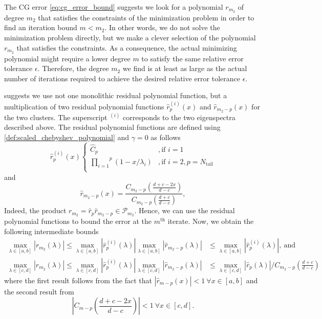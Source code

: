 The CG error \cref{eq:cg_error_bound} suggests we look for a polynomial $r_{m_2}$ of degree $m_2$ that satisfies the constraints of the minimization problem in order to find an iteration bound $m < m_2$. In other words, we do not solve the minimization problem directly, but we make a clever selection of the polynomial $r_{m_2}$ that satisfies the constraints. As a consequence, the actual minimizing polynomial might require a lower degree $m$ to satisfy the same relative error tolerance $\epsilon$. Therefore, the degree $m_2$ we find is at least as large as the actual number of iterations required to achieve the desired relative error tolerance $\epsilon$.

\citeauthor{cg_sharpened_convrate_Axelsson1976} suggests we use not one monolithic residual polynomial function, but a multiplication of two residual polynomial functions $\hat{r}^{(i)}_p(x)$ and $\hat{r}_{m_2-p}(x)$ for the two clusters. The superscript $^{(i)}$ corresponds to the two eigenspectra described above. The residual polynomial functions are defined using \cref{def:scaled_chebyshev_polynomial} and $\gamma = 0$ as follows
\begin{equation}
    \hat{r}^{(i)}_p (x)
    \begin{cases}
        \hat{C}_p&, \text{if } i = 1\\
        \overset{p}{\underset{i=1}{\prod}} (1 - x/\lambda_i)&, \text{if } i = 2, p = N_{\text{tail}}\\
    \end{cases}
    \label{eq:residual_polynomial_rm}
\end{equation}
and
\begin{equation}
    \hat{r}_{{m_2}-p} (x) = \frac{C_{m_2-p} \left(\frac{d + c - 2x}{d - c}\right)}{C_{m_2-p}\left(\frac{d + c}{d - c}\right)},
    \label{eq:residual_polynomial_rpm}
\end{equation}
Indeed, the product $r_{m_2} = \hat{r}_p \hat{r}_{m_2-p} \in \mathcal{P}_{m_2}$. Hence, we can use the residual polynomial functions to bound the error at the $m^{\text{th}}$ iterate. Now, we obtain the following intermediate bounds
\begin{subequations}
    \begin{align}
        \max_{\lambda \in [a,b]} |r_{m_2}(\lambda)| \leq \max_{\lambda \in [a,b]} |\hat{r}^{(i)}_p(\lambda)| \max_{\lambda \in [a,b]} |\hat{r}_{m_2-p}(\lambda)| &\leq \max_{\lambda \in [a,b]} |\hat{r}^{(i)}_p(\lambda)|, \ \text{and} \label{eq:residual_polynomial_bound_ab}\\
        \max_{\lambda \in [c,d]} |r_{m_2}(\lambda)| \leq \max_{\lambda \in [c,d]} |\hat{r}^{(i)}_p(\lambda)| \max_{\lambda \in [c,d]} |\hat{r}_{m_2-p}(\lambda)| &\leq \max_{\lambda \in [c,d]} |\hat{r}_{p}(\lambda)|/C_{m_2-p}\left(\frac{d+c}{d-c}\right) \label{eq:residual_polynomial_bound_cd}
    \end{align}
\end{subequations}
where the first result follows from the fact that $|\hat{r}_{m-p}(x)| < 1 \ \forall x \in [a,b]$ and the second result from 
\[
    \left|C_{m-p}\left(\frac{d+c -2x}{d-c}\right)\right| < 1 \ \forall x \in [c,d].
\]

